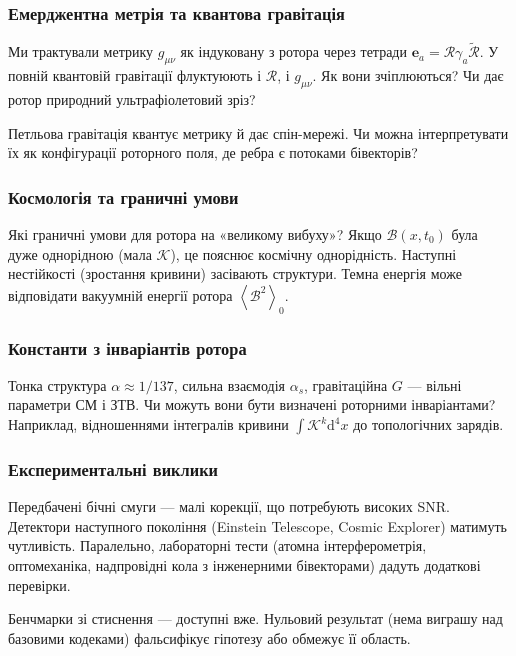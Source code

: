 \documentclass[11pt,a4paper]{article}
\newcommand{\grade}[2]{\left\langle #1 \right\rangle_{#2}}
\newcommand{\scal}[1]{\grade{#1}{0}}
\newcommand{\rev}[1]{\widetilde{#1}}           %
\newcommand{\Rotor}{\mathcal{R}}
\newcommand{\Biv}{\mathcal{B}}
\theoremstyle{definition}
\theoremstyle{plain}
\theoremstyle{remark}
\begin{document}
\subsubsection{Емерджентна метрія та квантова гравітація}

Ми трактували метрику $g_{\mu\nu}$ як індуковану з ротора через тетради $\mathbf{e}_a = \Rotor \gamma_a \rev{\Rotor}$. У повній квантовій гравітації флуктуюють і $\Rotor$, і $g_{\mu\nu}$. Як вони зчіплюються? Чи дає ротор природний ультрафіолетовий зріз?

Петльова гравітація квантує метрику й дає спін-мережі. Чи можна інтерпретувати їх як конфігурації роторного поля, де ребра є потоками бівекторів?

\subsubsection{Космологія та граничні умови}

Які граничні умови для ротора на «великому вибуху»? Якщо $\Biv(x,t_0)$ була дуже однорідною (мала $\mathcal{K}$), це пояснює космічну однорідність. Наступні нестійкості (зростання кривини) засівають структури. Темна енергія може відповідати вакуумній енергії ротора $\scal{\Biv^2}$.

\subsubsection{Константи з інваріантів ротора}

Тонка структура $\alpha \approx 1/137$, сильна взаємодія $\alpha_s$, гравітаційна $G$ — вільні параметри СМ і ЗТВ. Чи можуть вони бути визначені роторними інваріантами? Наприклад, відношеннями інтегралів кривини $\int \mathcal{K}^k \mathrm{d}^4x$ до топологічних зарядів.

\subsubsection{Експериментальні виклики}

Передбачені бічні смуги — малі корекції, що потребують високих SNR. Детектори наступного покоління (Einstein Telescope, Cosmic Explorer) матимуть чутливість. Паралельно, лабораторні тести (атомна інтерферометрія, оптомеханіка, надпровідні кола з інженерними бівекторами) дадуть додаткові перевірки.

Бенчмарки зі стиснення — доступні вже. Нульовий результат (нема виграшу над базовими кодеками) фальсифікує гіпотезу або обмежує її область.
\end{document}
